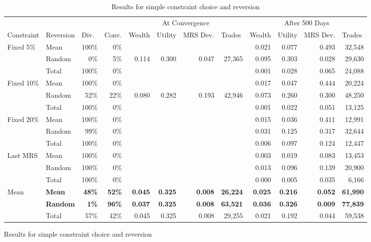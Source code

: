 \documentclass[12pt,a4paper,titlepage]{article}
\begin{document}
\begin{figure}[H]
\begin{table}
  \begin{tabular}{ll|rr|rrrr|rrrr}
    &  & \multicolumn{1}{|l}{} & \multicolumn{1}{l|}{} & \multicolumn{ 4}{c|}{At Convergence} & \multicolumn{ 4}{c}{After 500 Days} \\
    Constraint & Reversion & \multicolumn{1}{l}{Div.} & \multicolumn{1}{l|}{Conv.} & \multicolumn{1}{l}{Wealth} & \multicolumn{1}{l}{Utility} & \multicolumn{1}{l}{MRS Dev.} & \multicolumn{1}{l|}{Trades} & \multicolumn{1}{l}{Wealth} & \multicolumn{1}{l}{Utility} & \multicolumn{1}{l}{MRS Dev.} & \multicolumn{1}{l}{Trades} \\ 
    \hline
    \multicolumn{ 1}{l}{Fixed 5\%} & Mean & 100\% & 0\% &  &  &  &  & 0.021 & 0.077 & 0.493 & 32,548 \\
    \multicolumn{ 1}{l}{} & Random & 0\% & 5\% & 0.114 & 0.300 & 0.047 & 27,365 & 0.095 & 0.303 & 0.028 & 29,630 \\
    \multicolumn{ 1}{l}{} & Total & 100\% & 0\% &  &  &  &  & 0.001 & 0.028 & 0.065 & 24,088 \\
    \multicolumn{ 1}{l}{Fixed 10\%} & Mean & 100\% & 0\% &  &  &  &  & 0.017 & 0.047 & 0.444 & 20,224 \\
    \multicolumn{ 1}{l}{} & Random & 52\% & 22\% & 0.080 & 0.282 & 0.193 & 42,946 & 0.073 & 0.260 & 0.300 & 48,250 \\
    \multicolumn{ 1}{l}{} & Total & 100\% & 0\% &  &  &  &  & 0.001 & 0.022 & 0.051 & 13,125 \\
    \multicolumn{ 1}{l}{Fixed 20\%} & Mean & 100\% & 0\% &  &  &  &  & 0.015 & 0.036 & 0.411 & 12,991 \\
    \multicolumn{ 1}{l}{} & Random & 99\% & 0\% &  &  &  &  & 0.031 & 0.125 & 0.317 & 32,644 \\
    \multicolumn{ 1}{l}{} & Total & 100\% & 0\% &  &  &  &  & 0.006 & 0.097 & 0.124 & 12,447 \\
    \multicolumn{ 1}{l}{Last MRS} & Mean & 100\% & 0\% &  &  & &  & 0.003 & 0.019 & 0.083 & 13,453 \\
    \multicolumn{ 1}{l}{} & Random & 100\% & 0\% &  &  &  &  & 0.013 & 0.096 & 0.139 & 20,900 \\
    \multicolumn{ 1}{l}{} & Total & 100\% & 0\% &  &  &  &  & 0.000 & 0.005 & 0.035 & 6,166 \\
    \multicolumn{ 1}{l}{Mean} & \textbf{Mean} & \textbf{48\%} & \textbf{52\%} & \textbf{0.045} & \textbf{0.325} & \textbf{0.008} & \textbf{26,224} & \textbf{0.025} & \textbf{0.216} & \textbf{0.052} & \textbf{61,990} \\
    \multicolumn{ 1}{l}{} & \textbf{Random} & \textbf{1\%} & \textbf{96\%} & \textbf{0.037} & \textbf{0.325} & \textbf{0.008} & \textbf{63,521} & \textbf{0.036} & \textbf{0.326} & \textbf{0.009} & \textbf{77,839} \\
    \multicolumn{ 1}{l}{} & Total & 57\% & 42\% & 0.045 & 0.325 & 0.008 & 29,255 & 0.021 & 0.192 & 0.044 & 59,538 \\
  \end{tabular}
\caption{Results for simple constraint choice and reversion}
\label{tab:simple}
\end{table}



\end{figure}
\end{document}
